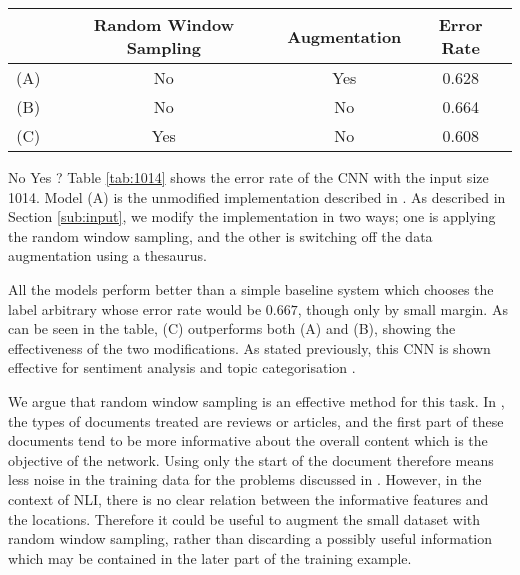 
\begin{table*}[]
\centering
\caption{Error Rate of Models with Input Size 1014}
\label{tab:1014}
\begin{tabular}{cccc}
& Random Window Sampling & Augmentation  & Error Rate \\ \hline
(A)& No                     & Yes                & 0.628      \\
(B)& No                     & No                 & \color{red}0.664\color{black}      \\
(C)& Yes                    & No                 & \color{red}0.608\color{black}     
\end{tabular}
\end{table*}
\color{red}No Yes ?\color{black}
Table \ref{tab:1014} shows the error rate of the CNN with the input size 1014.
Model (A) is the unmodified implementation described in \citep{zhang2015character}.
As described in Section \ref{sub:input}, we modify the implementation in two ways; one is applying the random window sampling, and the other is switching off the data augmentation using a thesaurus.

All the models perform better than a simple baseline system which chooses the label arbitrary whose error rate would be $0.667$, though only by small margin.
As can be seen in the table, (C) outperforms both (A) and (B), showing the effectiveness of the two modifications.
As stated previously, this CNN is shown effective for sentiment analysis and topic categorisation \citep{zhang2015character}.

We argue that random window sampling is an effective method for this task.
In \citep{zhang2015character}, the types of documents treated are reviews or articles, and the first part of these documents tend to be more informative about the overall content which is the objective of the network.
Using only the start of the document therefore means less noise in the training data for the problems discussed in \citep{zhang2015character}.
However, in the context of NLI, there is no clear relation between the informative features and the locations.
Therefore it could be useful to augment the small dataset with random window sampling, rather than discarding a possibly useful information which may be contained in the later part of the training example.

